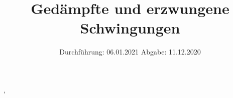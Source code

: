 

\subject{Versuch Nr. 354}
\title{Gedämpfte und erzwungene Schwingungen}
\date{%
  Durchführung: 06.01.2021
  \hspace{3em}
  Abgabe: 11.12.2020
}



\maketitle
\thispagestyle{empty}
\tableofcontents
\newpage





‚

\nocite{*}
\printbibliography{}

